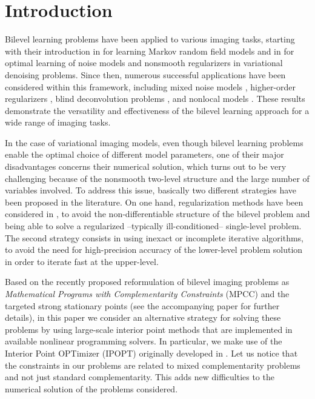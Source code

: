 \documentclass[review,onefignum,onetabnum]{siamonline190516}
\begin{document}
\section{Introduction}
Bilevel learning problems have been applied to various imaging tasks, starting with their introduction in \cite{tappen2007utilizing} for learning Markov random field models and in \cite{de2013image, kunisch2013bilevel} for optimal learning of noise models and nonsmooth regularizers in variational denoising problems. Since then, numerous successful applications have been considered within this framework, including mixed noise models \cite{calatroni2013dynamic,calatroni2019analysis}, higher-order regularizers \cite{reyes2015a,davoli2018one,davoli2019adaptive,hintermuller2017optimal}, blind deconvolution problems \cite{hintermuller2015bilevel}, and nonlocal models \cite{d2021bilevel,bartels2020parameter}. These results demonstrate the versatility and effectiveness of the bilevel learning approach for a wide range of imaging tasks.


In the case of variational imaging models, even though bilevel learning problems enable the optimal choice of different model parameters, one of their major disadvantages concerns their numerical solution, which turns out to be very challenging because of the nonsmooth two-level structure and the large number of variables involved. To address this issue, basically two different strategies have been proposed in the literature. On one hand, regularization methods have been considered in \cite{de2013image,kunisch2013bilevel}, to avoid the non-differentiable structure of the bilevel problem and being able to solve a regularized --typically ill-conditioned-- single-level problem. The second strategy consists in using inexact or incomplete iterative algorithms, to avoid the need for high-precision accuracy of the lower-level problem solution \cite{ochs2016techniques,ehrhardt2020inexact} in order to iterate fast at the upper-level.

Based on the recently proposed reformulation of bilevel imaging problems as \emph{Mathematical Programs with Complementarity Constraints} (MPCC) and the targeted strong stationary points (see the accompanying paper \cite{d2021bilevel} for further details), in this paper we consider an alternative strategy for solving these problems by using large-scale interior point methods that are implemented in available nonlinear programming solvers. In particular, we make use of the Interior Point OPTimizer (IPOPT) originally developed in \cite{wachter2006implementation}. Let us notice that the constraints in our problems are related to mixed complementarity problems and not just standard complementarity. This adds new difficulties to the numerical solution of the problems considered.
\end{document}
